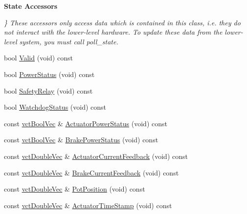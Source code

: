 \begin{Indent}{\bf State Accessors}\par
{\em \} These accessors only access data which is contained in this class, i.\+e. they do not interact with the lower-\/level hardware. To update these data from the lower-\/level system, you must call poll\+\_\+state. }\begin{DoxyCompactItemize}
\item 
bool \hyperlink{classsaw_robot_i_o1394_1_1osa_robot1394_a0717e94a561fb7dff6f438cb8be3858f}{Valid} (void) const 
\item 
bool \hyperlink{classsaw_robot_i_o1394_1_1osa_robot1394_a27fbb2ba67d54d480873273d3912ca1c}{Power\+Status} (void) const 
\item 
bool \hyperlink{classsaw_robot_i_o1394_1_1osa_robot1394_aaaaaff30d724104f33813430ee391ceb}{Safety\+Relay} (void) const 
\item 
bool \hyperlink{classsaw_robot_i_o1394_1_1osa_robot1394_a375eafa1dcc5e6e022472b1a435a8de9}{Watchdog\+Status} (void) const 
\item 
const \hyperlink{vct_dynamic_vector_types_8h_aeb2237c134aee3769198bd9d55c8a9e0}{vct\+Bool\+Vec} \& \hyperlink{classsaw_robot_i_o1394_1_1osa_robot1394_a1eda6e2132f4a0127a77273d8df6d0ea}{Actuator\+Power\+Status} (void) const 
\item 
const \hyperlink{vct_dynamic_vector_types_8h_aeb2237c134aee3769198bd9d55c8a9e0}{vct\+Bool\+Vec} \& \hyperlink{classsaw_robot_i_o1394_1_1osa_robot1394_a9f396a55f74ca6105d10f315052c052a}{Brake\+Power\+Status} (void) const 
\item 
const \hyperlink{vct_dynamic_vector_types_8h_ade4b3068c86fb88f41af2e5187e491c2}{vct\+Double\+Vec} \& \hyperlink{classsaw_robot_i_o1394_1_1osa_robot1394_aa2b1e24f66bb30181d61001fa6b04836}{Actuator\+Current\+Feedback} (void) const 
\item 
const \hyperlink{vct_dynamic_vector_types_8h_ade4b3068c86fb88f41af2e5187e491c2}{vct\+Double\+Vec} \& \hyperlink{classsaw_robot_i_o1394_1_1osa_robot1394_a56bdc8fda6bbe0e26d3ba273d522b0d6}{Brake\+Current\+Feedback} (void) const 
\item 
const \hyperlink{vct_dynamic_vector_types_8h_ade4b3068c86fb88f41af2e5187e491c2}{vct\+Double\+Vec} \& \hyperlink{classsaw_robot_i_o1394_1_1osa_robot1394_aee6e3eb5964265bf0f6224c81649c213}{Pot\+Position} (void) const 
\item 
const \hyperlink{vct_dynamic_vector_types_8h_ade4b3068c86fb88f41af2e5187e491c2}{vct\+Double\+Vec} \& \hyperlink{classsaw_robot_i_o1394_1_1osa_robot1394_add104f977b5a360fe8bda14f2e94f82a}{Actuator\+Time\+Stamp} (void) const 

\end{DoxyCompactItemize}
\end{Indent}
